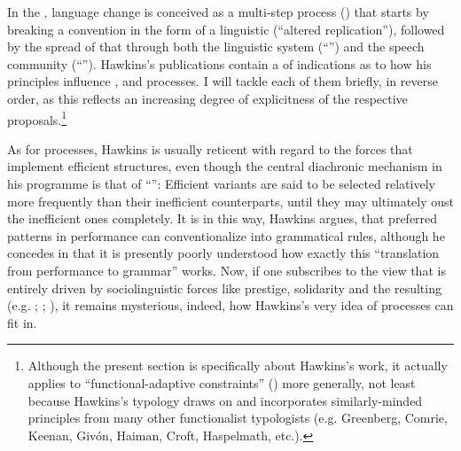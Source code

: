 \documentclass[output=paper]{langsci/langscibook}
\begin{document}
In the , language change is conceived as a multi-step process (\citealt{Croft2000_Change,Croft2006_Change,Aitchison2013_Change}) that starts by breaking a convention in the form of a linguistic  (“altered replication”), followed by the spread of that  through both the linguistic system (“”) and the speech community (“”). Hawkins’s publications contain a  of indications as to how his  principles influence ,  and  processes. I will tackle each of them briefly, in reverse order, as this reflects an increasing degree of explicitness of the respective proposals.\footnote{Although the present section is specifically about Hawkins’s work, it actually applies to “functional-adaptive constraints” () more generally, not least because Hawkins’s  typology draws on and incorporates similarly-minded principles from many other functionalist typologists (e.g. Greenberg, Comrie, Keenan, Givón, Haiman, Croft, Haspelmath, etc.).}

As for  processes, Hawkins is usually reticent with regard to the forces that implement efficient structures, even though the central diachronic mechanism in his programme is that of “”: Efficient variants are said to be selected relatively more frequently than their inefficient counterparts, until they may ultimately oust the inefficient ones completely. It is in this way, Hawkins argues, that preferred patterns in performance can conventionalize into grammatical rules, although he concedes in \citet[10]{Hawkins2014_VarEff} that it is presently poorly understood how exactly this “translation from performance to grammar” works. Now, if one subscribes to the view that  is entirely driven by sociolinguistic forces like prestige, solidarity and the resulting  (e.g. \citealt{Croft2000_Change}; \citealt{Cristofaro2017_Dep}; ), it remains mysterious, indeed, how Hawkins’s very idea of  processes can fit in. 
\end{document}
